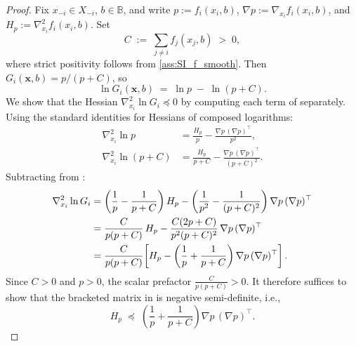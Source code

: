 \documentclass{article}
\begin{document}
            \begin{proof}
                Fix $x_{-i}\in X_{-i}$, $b\in\mathbb{B}$, and write $p := f_i(x_i,b)$, $\nabla p := \nabla_{x_i}f_i(x_i,b)$, and $H_p := \nabla^2_{x_i}f_i(x_i,b)$. Set
                \[
                    C \;:=\; \sum_{j\neq i}f_j(x_j,b) \;>\; 0,
                \]
                where strict positivity follows from \ref{ass:SI_f_smooth}. Then $G_i(\mathbf{x},b) = p/(p+C)$, so
                \begin{equation}\label{eq:SI_logGi_decomp}
                    \ln G_i(\mathbf{x},b) \;=\; \ln p \;-\; \ln(p + C).
                \end{equation}
                We show that the Hessian $\nabla^2_{x_i}\ln G_i \preceq 0$ by computing each term of  separately. Using the standard identities for Hessians of composed logarithms:
                \begin{align}
                    \nabla^2_{x_i}\ln p &= \frac{H_p}{p} - \frac{\nabla p\,(\nabla p)^\top}{p^2}, \label{eq:SI_hess_lnp}\\
                    \nabla^2_{x_i}\ln(p+C) &= \frac{H_p}{p+C} - \frac{\nabla p\,(\nabla p)^\top}{(p+C)^2}. \label{eq:SI_hess_lnpC}
                \end{align}
                Subtracting  from :
                \begin{align}
                    \nabla^2_{x_i}\ln G_i
                    &= \left(\frac{1}{p}-\frac{1}{p+C}\right)H_p
                      - \left(\frac{1}{p^2}-\frac{1}{(p+C)^2}\right)\nabla p\,(\nabla p)^\top \notag\\
                    &= \frac{C}{p(p+C)}\,H_p
                      - \frac{C(2p+C)}{p^2(p+C)^2}\,\nabla p\,(\nabla p)^\top \notag\\
                    &= \frac{C}{p(p+C)}\!\left[H_p - \left(\frac{1}{p}+\frac{1}{p+C}\right)\nabla p\,(\nabla p)^\top\right]. \label{eq:SI_hess_Gi}
                \end{align}
                Since $C>0$ and $p>0$, the scalar prefactor $\frac{C}{p(p+C)}>0$. It therefore suffices to show that the bracketed matrix in  is negative semi-definite, i.e.,
                \begin{equation}\label{eq:SI_need_to_show}
                    H_p \;\preceq\; \left(\frac{1}{p}+\frac{1}{p+C}\right)\nabla p\,(\nabla p)^\top.
                \end{equation}

\end{proof}
\end{document}
